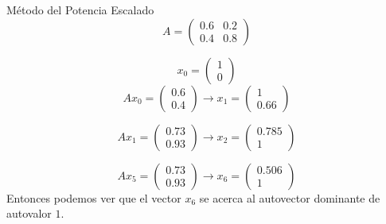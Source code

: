 \begin{frame}
	\begin{solution}
		Método del Potencia Escalado
		\begin{equation*}
			A=
			\begin{pmatrix}
				0.6 & 0.2 \\
				0.4 & 0.8
			\end{pmatrix}
		\end{equation*}

		\begin{equation*}
			x_{0}=
			\begin{pmatrix}
				1 \\
				0
			\end{pmatrix}
		\end{equation*}
		\begin{equation*}
			Ax_{0}=
			\begin{pmatrix}
				0.6 \\
				0.4
			\end{pmatrix}\to
			x_{1}=
			\begin{pmatrix}
				1 \\
				0.66
			\end{pmatrix}
		\end{equation*}

		\begin{equation*}
			Ax_{1}=
			\begin{pmatrix}
				0.73 \\
				0.93
			\end{pmatrix}\to
			x_{2}=
			\begin{pmatrix}
				0.785 \\
				1
			\end{pmatrix}
		\end{equation*}

		\begin{equation*}
			Ax_{5}=
			\begin{pmatrix}
				0.73 \\
				0.93
			\end{pmatrix}\to
			x_{6}=
			\begin{pmatrix}
				0.506 \\
				1
			\end{pmatrix}
		\end{equation*}
		Entonces podemos ver que el vector $x_{6}$ se acerca al
		autovector dominante de autovalor $1$.
	\end{solution}
\end{frame}